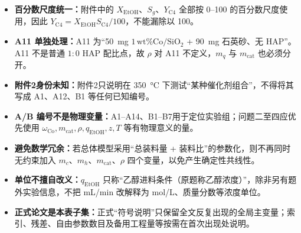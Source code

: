 \documentclass[UTF8,zihao=-4,a4paper,fontset=none]{ctexart}
\begin{document}
\begin{itemize}
  \item \textbf{百分数尺度统一：}附件中的 $X_{\mathrm{EtOH}}$、$S_g$、$Y_{\mathrm{C4}}$ 全部按 0--100 的百分数尺度使用，因此 $Y_{\mathrm{C4}}=X_{\mathrm{EtOH}}S_{\mathrm{C4}}/100$，不能漏除以 100。
  \item \textbf{A11 单独处理：}A11 为“\SI{50}{\milli\gram} $1\,\mathrm{wt}\%\mathrm{Co/SiO_2}$ + \SI{90}{\milli\gram} 石英砂、无 HAP”。A11 不是普通 $1{:}0$ HAP 配比点，故 $\rho$ 对 A11 不定义，$m_q$ 与 $m_{\mathrm{cat}}$ 也必须分开。
  \item \textbf{附件2身份未知：}附件2只说明在 \SI{350}{\degreeCelsius} 下测试“某种催化剂组合”，不得将其写成 A1、A12、B1 等任何已知编号。
  \item \textbf{A/B 编号不是物理变量：}A1--A14、B1--B7用于定位实验组；问题二至四应优先使用 $\omega_{\mathrm{Co}},m_{\mathrm{cat}},\rho,q_{\mathrm{EtOH}},z,T$ 等有物理意义的量。
  \item \textbf{避免数学冗余：}若总体模型采用“总装料量 + 装料比”的参数化，则不再同时无约束加入 $m_c$、$m_h$、$m_{\mathrm{cat}}$、$\rho$ 四个变量，以免产生确定性共线性。
  \item \textbf{单位不擅自改义：}$q_{\mathrm{EtOH}}$ 只称“乙醇进料条件（原题称乙醇浓度）”，除非另有题外实验信息，不把 mL/min 改解释为 mol/L、质量分数等浓度单位。
  \item \textbf{正式论文是本表子集：}正式“符号说明”只保留全文反复出现的全局主变量；索引、残差、自由参数数目及备用工程量等按需在首次出现处说明。
\end{itemize}
\end{document}
